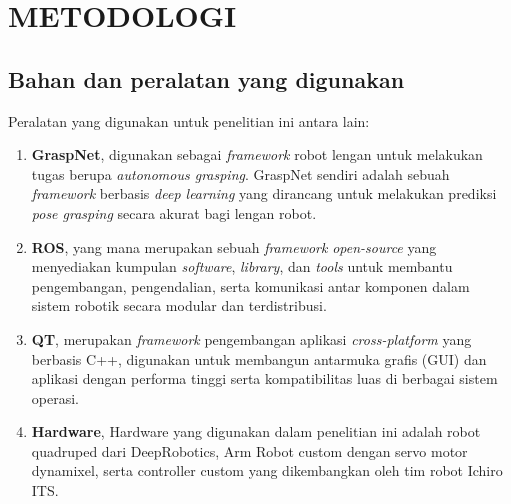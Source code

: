 \chapter{METODOLOGI}


\section{Bahan dan peralatan yang digunakan}

Peralatan yang digunakan untuk penelitian ini antara lain:

\begin{enumerate}
  \item \textbf{GraspNet}, digunakan sebagai \emph{framework} robot lengan untuk
  melakukan tugas berupa \emph{autonomous grasping}. GraspNet sendiri adalah sebuah \emph{framework}
  berbasis \emph{deep learning} yang dirancang untuk melakukan prediksi \emph{pose grasping} secara akurat bagi lengan robot.
  \item \textbf{ROS}, yang mana merupakan sebuah \emph{framework}
  \emph{open-source} yang menyediakan kumpulan \emph{software}, \emph{library}, dan \emph{tools} untuk membantu pengembangan,
  pengendalian, serta komunikasi antar komponen dalam sistem robotik secara modular dan terdistribusi.
  \item \textbf{QT}, merupakan \emph{framework} pengembangan aplikasi \emph{cross-platform} yang berbasis C++,
  digunakan untuk membangun antarmuka grafis (GUI) dan aplikasi dengan performa tinggi serta kompatibilitas luas di berbagai sistem operasi.
  \item \textbf{Hardware}, Hardware yang digunakan dalam penelitian ini adalah robot quadruped dari DeepRobotics, Arm Robot custom dengan servo motor dynamixel,
  serta controller custom yang dikembangkan oleh tim robot Ichiro ITS.
\end{enumerate}


